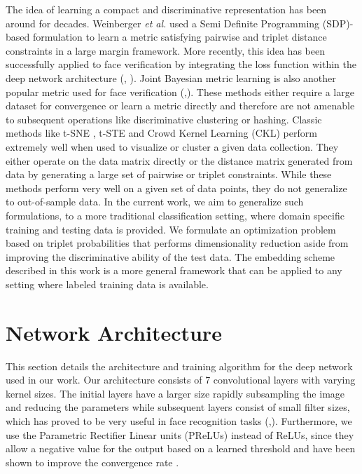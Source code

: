 \documentclass[10pt,twocolumn,letterpaper]{article}
\begin{document}
The idea of learning a compact and discriminative representation has been around for decades. Weinberger \emph{et al.}  \cite{lmnn05} used a Semi Definite Programming (SDP)-based formulation to learn a metric satisfying pairwise and triplet distance constraints in a large margin framework. More recently, this idea has been successfully applied to face verification by integrating the loss function within the deep network architecture (\cite{facenet15}, \cite{parkhi15}). Joint Bayesian metric learning is also another popular metric used for face verification (\cite{fvf13},\cite{chen15wacv}). These methods either require a large dataset for convergence or learn a metric directly and therefore are not amenable to subsequent operations like discriminative clustering or hashing. Classic methods like t-SNE \cite{tsne}, t-STE \cite{tste} and Crowd Kernel Learning (CKL) \cite{CKL} perform extremely well when used to visualize or cluster a given data collection. They either operate on the data matrix directly or the distance matrix generated from data by generating a large set of pairwise or triplet constraints. While these methods perform very well on a given set of data points, they do not generalize to out-of-sample data. In the current work, we aim to generalize such formulations, to a more traditional classification setting, where domain specific training and testing data is provided. We formulate an optimization problem based on triplet probabilities that performs dimensionality reduction aside from improving the discriminative ability of the test data. The embedding scheme described in this work is a more general framework that can be applied to any setting where labeled training data is available.

%
 \section{Network Architecture}\label{net}

This section details the architecture and training algorithm for the deep
network used in our work. Our architecture consists of 7 convolutional layers
with varying kernel sizes. The initial layers have a larger size rapidly
subsampling the image and reducing the parameters while subsequent layers consist
of small filter sizes, which has proved to be very useful in face recognition
tasks (\cite{parkhi15},\cite{casia14}). Furthermore, we use the Parametric
Rectifier Linear units (PReLUs) instead of ReLUs, since they allow a negative
value for the output based on a learned threshold and have been shown to improve
the convergence rate \cite{prelu15}. 
\end{document}

